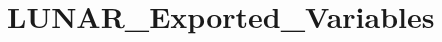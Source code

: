 \hypertarget{group___l_u_n_a_r___exported___variables}{}\section{L\+U\+N\+A\+R\+\_\+\+Exported\+\_\+\+Variables}
\label{group___l_u_n_a_r___exported___variables}
